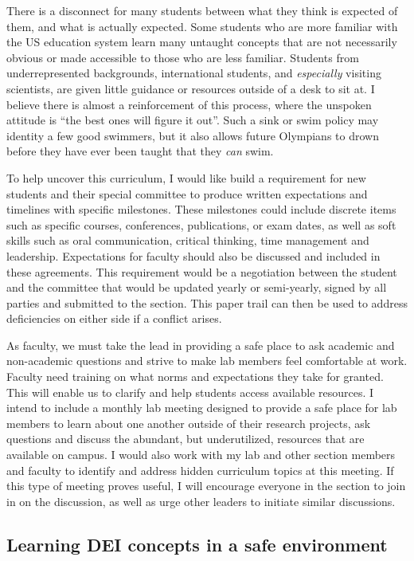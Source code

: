 \documentclass[11pt]{article}
\begin{document}
There is a disconnect for many students between what they think is expected of them, and what is actually expected. Some students who are more familiar with the US education system learn many untaught concepts that are not necessarily obvious or made accessible to those who are less familiar. Students from underrepresented backgrounds, international students, and \emph{especially} visiting scientists, are given little guidance or resources outside of a desk to sit at. I believe there is almost a reinforcement of this process, where the unspoken attitude is ``the best ones will figure it out''. Such a sink or swim policy may identity a few good swimmers, but it also allows future Olympians to drown before they have ever been taught that they \emph{can} swim. %

To help uncover this curriculum, I would like build a requirement for new students and their special committee to produce written expectations and timelines with specific milestones. These milestones could include discrete items such as specific courses, conferences, publications, or exam dates, as well as soft skills such as oral communication, critical thinking, time management and leadership. Expectations for faculty should also be discussed and included in these agreements. This requirement would be a negotiation between the student and the committee that would be updated yearly or semi-yearly, signed by all parties and submitted to the section. This paper trail can then be used to address deficiencies on either side if a conflict arises. 

As faculty, we must take the lead in providing a safe place to ask academic and non-academic questions and strive to make lab members feel comfortable at work. Faculty need training on what norms and expectations they take for granted. This will enable us to clarify and help students access available resources. I intend to include a monthly lab meeting designed to provide a safe place for lab members to learn about one another outside of their research projects, ask questions and discuss the abundant, but underutilized, resources that are available on campus. I would also work with my lab and other section members and faculty to identify and address hidden curriculum topics at this meeting. If this type of meeting proves useful, I will encourage everyone in the section to join in on the discussion, as well as urge other leaders to initiate similar discussions. %

\subsection*{Learning DEI concepts in a safe environment}
\end{document}
